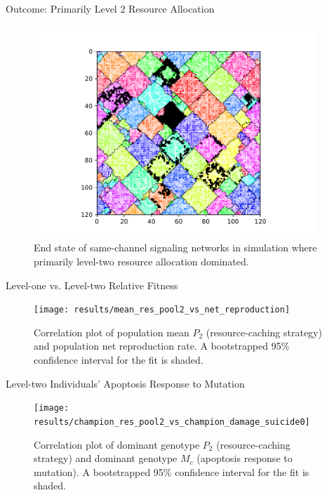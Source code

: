 \begin{frame}{Outcome: Primarily Level 2 Resource Allocation}
\begin{figure}
\begin{columns}
\begin{column}{0.6\textwidth}
\includegraphics[width=\textwidth]{img/results/ChannelMap_1019_update24995104}
\end{column}
\begin{column}{0.4\textwidth}
\caption{
End state of same-channel signaling networks in simulation where primarily level-two resource allocation dominated.
}
\end{column}
\end{columns}
\end{figure}
\end{frame}

\begin{frame}{Level-one vs. Level-two Relative Fitness}

\begin{figure}
\texttt{[image: results/mean\_res\_pool2\_vs\_net\_reproduction]}
\caption{
Correlation plot of population mean $P_2$ (resource-caching strategy) and population net reproduction rate.
A bootstrapped 95\% confidence interval for the fit is shaded.
}
\end{figure}

\end{frame}

\begin{frame}{Level-two Individuals' Apoptosis Response to Mutation}

\begin{figure}
\texttt{[image: results/champion\_res\_pool2\_vs\_champion\_damage\_suicide0]}
\caption{
Correlation plot of dominant genotype $P_2$ (resource-caching strategy) and dominant genotype $M_{c}$ (apoptosis response to mutation).
A bootstrapped 95\% confidence interval for the fit is shaded.
}
\end{figure}

\end{frame}
